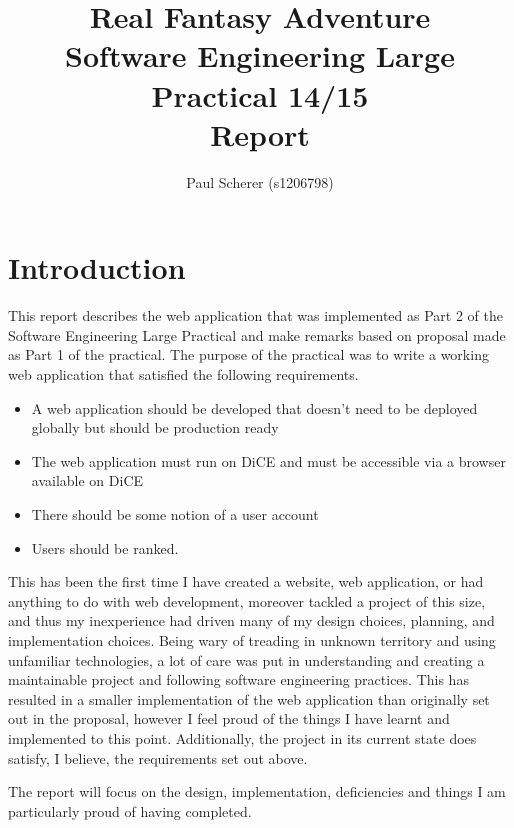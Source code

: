 \documentclass[11pt,a4paper]{article}
\begin{document}
\title{Real Fantasy Adventure \\
Software Engineering Large Practical 14/15 \\
Report}
\author{Paul Scherer (s1206798)}
\maketitle
\newpage

\tableofcontents
\newpage

\section{Introduction}
This report describes the web application that was implemented as Part 2 of the Software Engineering Large Practical and make remarks based on proposal made as Part 1 of the practical. The purpose of the practical was to write a working web application that satisfied the following requirements.

\begin{itemize}
	\item A web application should be developed that doesn't need to be deployed globally but should be production ready
	\item The web application must run on DiCE and must be accessible via a browser available on DiCE
	\item There should be some notion of a user account
	\item Users should be ranked.
\end{itemize}

This has been the first time I have created a website, web application, or had anything to do with web development, moreover tackled a project of this size, and thus my inexperience had driven many of my design choices, planning, and implementation choices. Being wary of treading in unknown territory and using unfamiliar technologies, a lot of care was put in understanding and creating a maintainable project and following software engineering practices. This has resulted in a smaller implementation of the web application than originally set out in the proposal, however I feel proud of the things I have learnt and implemented to this point. Additionally, the project in its current state does satisfy, I believe, the requirements set out above.

The report will focus on the design, implementation, deficiencies and things I am particularly proud of having completed.
\end{document}
